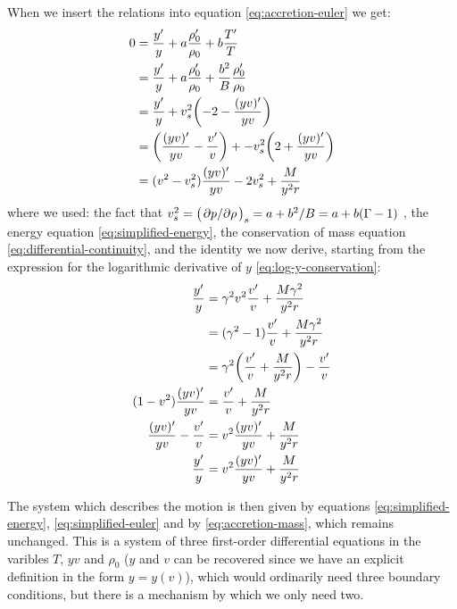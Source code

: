 \documentclass[main.tex]{subfiles}
\begin{document}
When we insert the relations into equation \eqref{eq:accretion-euler} we get:
%
\begin{subequations}
\begin{align}
  0 &= \frac{y ^{\prime}}{y} + a \frac{\rho_0 ^{\prime}}{\rho_0} + b \frac{T ^{\prime}}{T}  \\
  &= \frac{y ^{\prime}}{y} + a \frac{\rho_0 ^{\prime}}{\rho_0} + \frac{b^2}{B} \frac{\rho_0 ^{\prime}}{\rho_0}   \\
  &= \frac{y ^{\prime}}{y} + v_s^2 \qty(-2- \frac{(yv) ^{\prime}}{yv})    \\
  &= \qty(\frac{(yv) ^{\prime}}{yv} - \frac{v ^{\prime}}{v} ) + -v_s^2 \qty(2 + \frac{(yv) ^{\prime}}{yv})    \\
  &=  (v^2 - v_s^2) \frac{(yv) ^{\prime}}{yv} - 2 v_s^2 + \frac{M}{y^2r} \label{eq:simplified-euler}
\end{align}
\end{subequations}
%
where we used: the fact that \(v_s^2 = \qty(\pdv*{p}{\rho})_s = a + b^2 / B = a + b (\Gamma - 1)\) \cite[eq. B12]{Flammang:1982}, the energy equation \eqref{eq:simplified-energy}, the conservation of mass equation \eqref{eq:differential-continuity}, and the identity we now derive, starting from the expression for the logarithmic derivative of \(y\) \eqref{eq:log-y-conservation}:
%
\begin{subequations}
\begin{align}
  \frac{y ^{\prime}}{y}  &=  \gamma^2 v^2 \frac{v ^{\prime}}{v} + \frac{M \gamma^2}{y^2 r}  \\
  &= (\gamma^2 - 1) \frac{v ^{\prime}}{v} + \frac{M \gamma^2}{y^2 r}  \\
  &= \gamma^2 \qty(\frac{v ^{\prime}}{v} + \frac{M}{y^2 r}) - \frac{v ^{\prime}}{v}  \\
  (1-v^2) \frac{(yv) ^{\prime}}{yv} &= \frac{v ^{\prime}}{v} + \frac{M}{y^2 r}  \\
  \frac{(yv) ^{\prime}}{yv}- \frac{v ^{\prime}}{v}  &= v^2 \frac{(yv) ^{\prime}}{yv} + \frac{M}{y^2 r}  \\
  \frac{y ^{\prime}}{y} &= v^2 \frac{(yv) ^{\prime}}{yv} + \frac{M}{y^2 r}
\end{align}
\end{subequations}

The system which describes the motion is then given by equations \eqref{eq:simplified-energy}, \eqref{eq:simplified-euler} and by \eqref{eq:accretion-mass}, which remains unchanged.
This is a system of three first-order differential equations in the varibles \(T\), \(yv\) and \(\rho_0\) (\(y\) and \(v\) can be recovered since we have an explicit definition in the form \(y = y(v)\)), which would ordinarily need three boundary conditions, but there is a mechanism by which we only need two.
\end{document}
